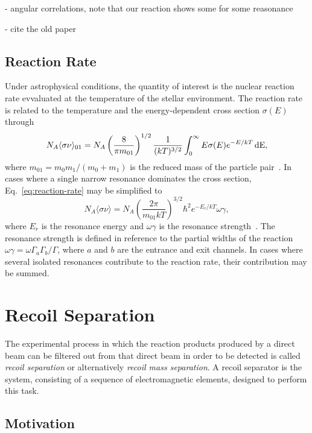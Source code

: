 - angular correlations, note that our reaction shows some for some reasonance

- cite the old paper

\subsection{Reaction Rate}
Under astrophysical conditions, the quantity of interest is the nuclear
reaction rate evvaluated at the temperature of the stellar environment. The
reaction rate is related to the temperature and the energy-dependent cross
section $\sigma(E)$ through
\begin{equation}
\label{eq:reaction-rate}
    N_A\langle\sigma\nu\rangle_{01} = N_A\left(\frac{8}{\pi m_{01}}\right)^{1/2}
        \frac{1}{(kT)^{3/2}}\int_0^{\infty} E\sigma(E)e^{-E/kT}\,\rm{d}E,
\end{equation}
where $m_{01} = m_0m_1/(m_0 + m_1)$ is the reduced mass of the particle
pair~\cite{Iliadis}. In cases where a single narrow resonance dominates the
cross section, Eq.~\ref{eq:reaction-rate} may be simplified to
\[
    N_A\langle\sigma\nu\rangle = N_A\left(\frac{2\pi}{m_{01}kT}\right)^{3/2}
        \hbar^2e^{-E_r/kT}\omega\gamma,
\]
where $E_r$ is the resonance energy and $\omega\gamma$ is the resonance
strength~\cite{Iliadis}. The resonance strength is defined in reference to the
partial widths of the reaction $\omega\gamma = \omega\Gamma_a\Gamma_b/\Gamma$,
where $a$ and $b$ are the entrance and exit channels. In cases where several
isolated resonances contribute to the reaction rate, their contribution may be
summed.



\section{Recoil Separation}
\label{sec:ch01-recoil-separation}

The experimental process in which the reaction products produced by a direct
beam can be filtered out from that direct beam in order to be detected is
called \emph{recoil separation} or alternatively \emph{recoil mass separation}.
A recoil separator is the system, consisting of a sequence of electromagnetic
elements, designed to perform this task.

\subsection{Motivation}
\label{ssec:recoil-separation-motivation}

